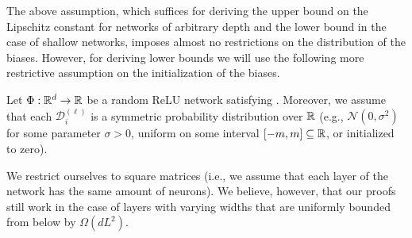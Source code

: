 The above assumption, which suffices for deriving the upper bound on the Lipschitz constant for networks of arbitrary depth and the lower bound in the case of shallow networks,
imposes almost no restrictions on the distribution of the biases.
However, for deriving lower bounds  we will use the following more restrictive assumption
on the initialization of the biases.
\begin{assumption}\label{assum:2}
  Let $\Phi: \mathbb{R}^d \to \mathbb{R}$ be a random ReLU network satisfying .
  Moreover, we assume that each $\mathcal{D}_i^{(\ell)}$ is a symmetric probability distribution over $\mathbb{R}$
  (e.g., $\mathcal{N}(0, \sigma^2)$ for some parameter $\sigma > 0$, uniform on some interval $[-m,m] \subseteq \mathbb{R}$, or initialized to zero).
\end{assumption}

We restrict ourselves to square matrices
(i.e., we assume that each layer of the network has the same amount of neurons).
We believe, however, that our proofs still work in the case of layers with varying widths
that are uniformly bounded from below by $\Omega (dL^2)$.

